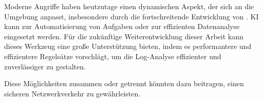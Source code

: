 Moderne Angriffe haben heutzutage einen dynamischen Aspekt, der sich an die Umgebung anpasst, insbesondere durch die fortschreitende Entwicklung von  \citep{Guembe_AIHACKER}. \gls{KI} kann zur Automatisierung von Aufgaben oder zur effizienten Datenanalyse eingesetzt werden. Für die zukünftige Weiterentwicklung dieser Arbeit kann dieses Werkzeug eine große Unterstützung bieten, indem es performantere und effizientere Regelsätze vorschlägt, um die Log-Analyse effizienter und zuverlässiger zu gestalten. 

Diese Möglichkeiten zusammen oder getrennt könnten dazu beitragen, einen sicheren Netzwerkverkehr zu gewährleisten.